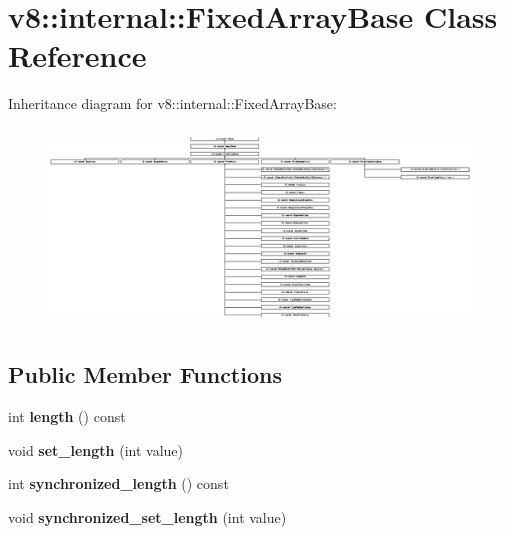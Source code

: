\hypertarget{classv8_1_1internal_1_1_fixed_array_base}{}\section{v8\+:\+:internal\+:\+:Fixed\+Array\+Base Class Reference}
\label{classv8_1_1internal_1_1_fixed_array_base}
Inheritance diagram for v8\+:\+:internal\+:\+:Fixed\+Array\+Base\+:\begin{figure}[H]
\begin{center}
\leavevmode
\includegraphics[height=5.245901cm]{classv8_1_1internal_1_1_fixed_array_base}
\end{center}
\end{figure}
\subsection*{Public Member Functions}
\begin{DoxyCompactItemize}
\item 
int {\bfseries length} () const \hypertarget{classv8_1_1internal_1_1_fixed_array_base_a2c3e68e799dd129e03ad376e4129ba6b}{}\label{classv8_1_1internal_1_1_fixed_array_base_a2c3e68e799dd129e03ad376e4129ba6b}

\item 
void {\bfseries set\+\_\+length} (int value)\hypertarget{classv8_1_1internal_1_1_fixed_array_base_a67b8eea4413f1651bfe1a8b4c74f53d1}{}\label{classv8_1_1internal_1_1_fixed_array_base_a67b8eea4413f1651bfe1a8b4c74f53d1}

\item 
int {\bfseries synchronized\+\_\+length} () const \hypertarget{classv8_1_1internal_1_1_fixed_array_base_af299c5ebae56695bf60c5cb56e16fa83}{}\label{classv8_1_1internal_1_1_fixed_array_base_af299c5ebae56695bf60c5cb56e16fa83}

\item 
void {\bfseries synchronized\+\_\+set\+\_\+length} (int value)\hypertarget{classv8_1_1internal_1_1_fixed_array_base_ac4a59d797d382670634fa9b046eba1cc}{}\label{classv8_1_1internal_1_1_fixed_array_base_ac4a59d797d382670634fa9b046eba1cc}

\end{DoxyCompactItemize}
